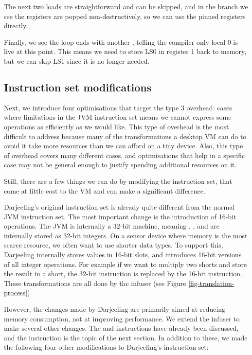 The next two loads are straightforward and can be skipped, and in the branch we see the registers are popped non-destructively, so we can use the pinned registers directly.

Finally, we see the loop ends with another , telling the compiler only local 0 is live at this point. This means we need to store LS0 in register 1 back to memory, but we can skip LS1 since it is no longer needed.

\subsection{Instruction set modifications}
Next, we introduce four optimisations that target the type 3 overhead: cases where limitations in the JVM instruction set means we cannot express some operations as efficiently as we would like. This type of overhead is the most difficult to address because many of the transformations a desktop VM can do to avoid it take more resources than we can afford on a tiny device. Also, this type of overhead covers many different cases, and optimisations that help in a specific case may not be general enough to justify spending additional resources on it.

Still, there are a few things we can do by modifying the instruction set, that come at little cost to the VM and can make a significant difference.

Darjeeling's original instruction set is already quite different from the normal JVM instruction set. The most important change is the introduction of 16-bit operations. The JVM is internally a 32-bit machine, meaning , , and  are internally stored as 32-bit integers. On a sensor device where memory is the most scarce resource, we often want to use shorter data types. To support this, Darjeeling internally stores values in 16-bit slots, and introduces 16-bit versions of all integer operations. For example if we want to multiply two shorts and store the result in a short, the 32-bit  instruction is replaced by the 16-bit  instruction. These transformations are all done by the infuser (see Figure \ref{fig-translation-process}).

However, the changes made by Darjeeling are primarily aimed at reducing memory consumption, not at improving performance. We extend the infuser to make several other changes. The  and  instructions have already been discussed, and the  instruction is the topic of the next section. In addition to these, we made the following four other modifications to Darjeeling's instruction set:

